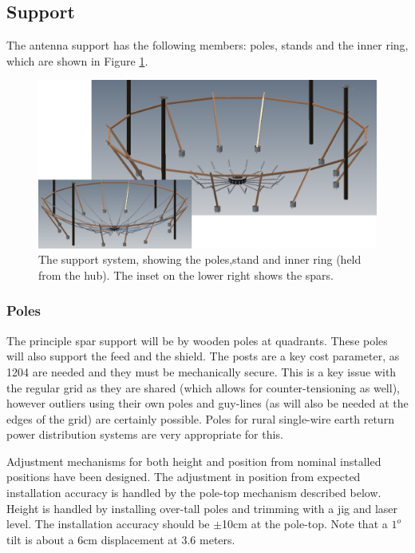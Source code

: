 \documentclass[11pt]{article}
\begin{document}
\subsection{Support}
The antenna support has the following members:  poles, stands and the inner ring, which are shown in Figure \ref{fig:support}.

\begin{figure}[H]
\centering
\includegraphics[width=\textwidth]{support.png}
\caption{The support system, showing the poles,stand and inner ring (held from the hub).  The inset on the lower right shows the spars.}
\label{fig:support}
\end{figure}

\subsubsection{Poles}
The principle spar support will be by wooden poles at quadrants.  These poles will also support the feed and the shield.  The posts are a key cost parameter, as 1204 are needed and they must be mechanically secure.  This is a key issue with the regular grid as they are shared (which allows for counter-tensioning as well), however outliers using their own poles and guy-lines (as will also be needed at the edges of the grid) are certainly possible.   Poles for rural single-wire earth return power distribution systems are very appropriate for this.

Adjustment mechanisms for both height and position from nominal installed positions have been designed.  The adjustment in position from expected installation accuracy is handled by the pole-top mechanism described below.  Height is handled by installing over-tall poles and trimming with a jig and laser level.  The installation accuracy should be $\pm$10cm at the pole-top.  Note that a $1^o$ tilt is about a 6cm displacement at 3.6 meters.
\end{document}
